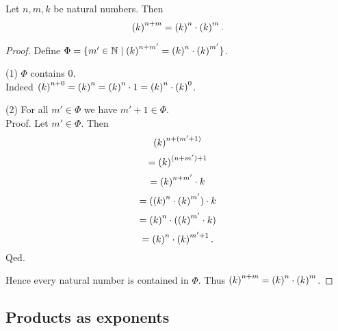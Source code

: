 \documentclass[../arithmetic.tex]{subfiles}
\begin{document}
  \begin{forthel}
    \begin{proposition}
      Let $n, m, k$ be natural numbers.
      Then \[ \left(k\right)^{n + m} = \left(k\right)^{n} \cdot \left(k\right)^{m}. \]
    \end{proposition}
    \begin{proof}
      Define $\Phi = \{ m' \in \mathbb{N} \mid \left(k\right)^{n + m'} = \left(k\right)^{n} \cdot \left(k\right)^{m'} \}$.

      (1) $\Phi$ contains $0$. \\
      Indeed $\left(k\right)^{n + 0}
        = \left(k\right)^{n}
        = \left(k\right)^{n} \cdot 1
        = \left(k\right)^{n} \cdot \left(k\right)^{0}$.

      (2) For all $m' \in \Phi$ we have $m' \plus 1 \in \Phi$. \\
      Proof.
        Let $m' \in \Phi$.
        Then
        \[  \left(k\right)^{n + (m' + 1)}                  \]
        \[    = \left(k\right)^{(n + m') + 1}              \]
        \[    = \left(k\right)^{n + m'} \cdot k            \]
        \[    = (\left(k\right)^{n} \cdot \left(k\right)^{m'}) \cdot k  \]
        \[    = \left(k\right)^{n} \cdot (\left(k\right)^{m'} \cdot k)  \]
        \[    = \left(k\right)^{n} \cdot \left(k\right)^{m' + 1}.       \]
      Qed.

      Hence every natural number is contained in $\Phi$.
      Thus $\left(k\right)^{n + m} = \left(k\right)^{n} \cdot \left(k\right)^{m}$.
    \end{proof}
  \end{forthel}


  \subsection*{Products as exponents}
\end{document}
